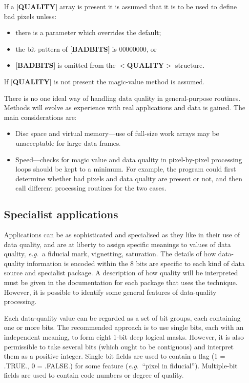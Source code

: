 \documentclass[twoside,11pt,nolof,noabs]{starlink}
\begin{document}
\begin{description}
If a {[}\textbf{QUALITY}{]} array is present it is
assumed that it is to be used to define bad pixels unless:
\begin{itemize}
\item there is a parameter which overrides the default;
\item the bit pattern of {[}\textbf{BADBITS}{]} is 00000000, or
\item {[}\textbf{BADBITS}{]} is omitted from the $<$\textbf{QUALITY}$>$ structure.
\end{itemize}
If {[}\textbf{QUALITY}{]} is not present the magic-value method is assumed.
\end{description}

There is no one ideal way of handling data quality in general-purpose
routines.  Methods will evolve as experience with real applications and
data is gained.  The main considerations are:
\begin{itemize}
\item Disc space and virtual memory---use of full-size work arrays
may be unacceptable for large data frames.
\item Speed---checks for magic value and data quality
in pixel-by-pixel processing loops should be kept to a
minimum.  For example, the program could
first determine whether bad pixels and data quality
are present or not, and then call different
processing routines for the two cases.
\end{itemize}

\subsection*{Specialist applications}
Applications can be as sophisticated and specialised as they
like in their use of data quality,
and are at liberty to assign specific meanings to
values of data quality, \textit{e.g.}\  a fiducial mark, vignetting,
saturation.
The details of
how data-quality information is encoded within the 8 bits
are specific to
each kind of data source and specialist package.  A description of how
quality will be interpreted must be given in the documentation for each
package that uses the technique.  However, it is possible to
identify some general features of data-quality processing.

Each data-quality value can be regarded as a
set of bit groups, each containing one or more bits.
The recommended approach is to use single bits, each
with an independent meaning, to form eight 1-bit deep logical
masks.  However, it is also permissible to take
several bits (which ought to be contiguous) and interpret them
as a positive integer.
Single bit fields are used to contain
a flag (1 = .TRUE., 0 = .FALSE.) for some feature (\textit{e.g.}\  ``pixel
in fiducial'').
Multiple-bit fields are used to contain code numbers or degree of
quality.
\end{document}
